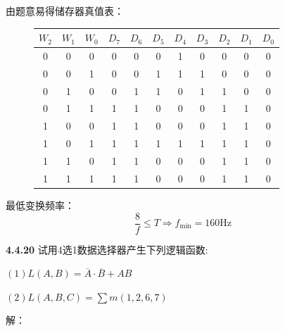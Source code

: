 \documentclass[a4paper,11pt,UTF8]{article}
\begin{document}
由题意易得储存器真值表：
\begin{figure}[H]
	\centering
	\begin{tabular}{ccc|cccccccc}
		\hline
		$W_2$ & $W_1$ & $W_0$ & $D_7$ & $D_6$ & $D_5$ & $D_4$ & $D_3$ & $D_2$ & $D_1$ & $D_0$\\
		\hline
		0 & 0 & 0 & 0 & 0 & 0 & 1 & 0 & 0 & 0 & 0\\
		0 & 0 & 1 & 0 & 0 & 1 & 1 & 1 & 0 & 0 & 0\\
		0 & 1 & 0 & 0 & 1 & 1 & 0 & 1 & 1 & 0 & 0\\
		0 & 1 & 1 & 1 & 1 & 0 & 0 & 0 & 1 & 1 & 0\\
		1 & 0 & 0 & 1 & 1 & 0 & 0 & 0 & 1 & 1 & 0\\
		1 & 0 & 1 & 1 & 1 & 1 & 1 & 1 & 1 & 1 & 0\\
		1 & 1 & 0 & 1 & 1 & 0 & 0 & 0 & 1 & 1 & 0\\
		1 & 1 & 1 & 1 & 1 & 0 & 0 & 0 & 1 & 1 & 0\\
		\hline
	\end{tabular}
\end{figure}
最低变换频率：
$$
	\frac8{f}\leq T\Rightarrow f_{\min}=160\mathrm{Hz}
$$

\textbf{4.4.20} 试用4选1数据选择器产生下列逻辑函数:

$(1)L(A,B)=\overline{A}\cdot\overline{B}+AB$

$(2)L(A,B,C)=\sum m(1,2,6,7)$

\noindent 解：
\end{document}
